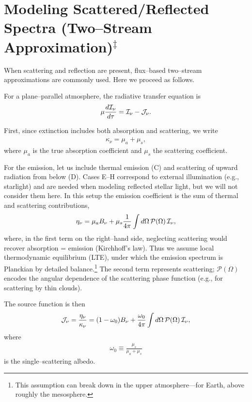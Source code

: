 \section{Modeling Scattered/Reflected Spectra (Two–Stream Approximation)$^\ddagger$}

When scattering and reflection are present, flux–based two–stream approximations are commonly used. Here we proceed as follows.

For a plane–parallel atmosphere, the radiative transfer equation is
\begin{align}
\mu \frac{d {\mathcal{I}_\nu}}{d \tau} = {\mathcal{I}_\nu} - {\mathcal{J}_\nu} .
\label{eq:radtrantau_start}
\end{align}

First, since extinction includes both absorption and scattering, we write
\begin{align}
\kappa_\nu = \mu_a + \mu_s ,
\label{eq:extsaa}
\end{align}
where $\mu_a$ is the true absorption coefficient and $\mu_s$ the scattering coefficient.

For the emission, let us include thermal emission (C) and scattering of upward radiation from below (D). Cases E–H correspond to external illumination (e.g., starlight) and are needed when modeling reflected stellar light, but we will not consider them here. In this setup the emission coefficient is the sum of thermal and scattering contributions,
\begin{align}
\eta_\nu = \mu_a B_\nu + \mu_s \frac{1}{4 \pi} \int d \Omega \, \mathcal{P}(\Omega)\, {\mathcal{I}_\nu} ,
\label{eq:emisaa}
\end{align}
where, in the first term on the right–hand side, neglecting scattering would recover absorption = emission (Kirchhoff's law). Thus we assume local thermodynamic equilibrium (LTE), under which the emission spectrum is Planckian by detailed balance.\footnote{This assumption can break down in the upper atmosphere—for Earth, above roughly the mesosphere.} The second term represents scattering; $\mathcal{P}(\Omega)$ encodes the angular dependence of the scattering phase function (e.g., for scattering by thin clouds).

The source function is then
\begin{align}
{\mathcal{J}_\nu} = \frac{\eta_\nu}{\kappa_\nu} = (1-\omega_0) B_\nu + \frac{\omega_0}{4 \pi} \int d \Omega \, \mathcal{P}(\Omega)\, {\mathcal{I}_\nu} ,
\label{eq:sourcef}
\end{align}
where
\begin{align}
\omega_0 \equiv \frac{\mu_s}{\mu_a + \mu_s}
\label{eq:sia}
\end{align}
is the single–scattering albedo.

